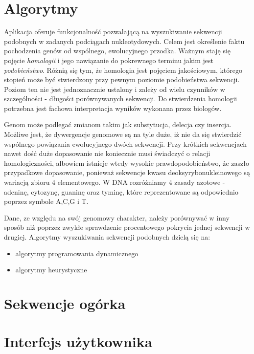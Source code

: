 \section{Algorytmy}
Aplikacja oferuje funkcjonalność pozwalającą na wyszukiwanie sekwencji podobnych w zadanych podciągach nukleotydowych.
Celem jest określenie faktu pochodzenia genów od wspólnego, ewolucyjnego przodka.
Ważnym staję się pojęcie \textit{homologii} i jego nawiązanie do pokrewnego terminu jakim jest \textit{podobieństwo}.
Różnią się tym, że homologia jest pojęciem jakościowym, którego stopień może być stwierdzony przy pewnym poziomie podobieństwa sekwencji.
Poziom ten nie jest jednoznacznie ustalony i zależy od wielu czynników w szczególności - długości porównywanych sekwencji.
Do stwierdzenia homologii potrzebna jest fachowa interpretacja wyników wykonana przez biologów.

Genom może podlegać zmianom takim jak substytucja, delecja czy insercja.
Możliwe jest, że dywergencje genomowe są na tyle duże, iż nie da się stwierdzić wspólnego powiązania ewolucyjnego dwóch sekwencji.
Przy krótkich sekwencjach nawet dość duże dopasowanie nie koniecznie musi świadczyć o relacji homologiczności, albowiem istnieje wtedy wysokie prawdopodobieństwo, że zaszło przypadkowe dopasowanie, ponieważ sekwencje kwasu deoksyrybonukleinowego są wariacją zbioru 4 elementowego. W DNA rozróżniamy 4 zasady azotowe - adeninę, cytozynę, guaninę oraz tyminę, które reprezentowane są odpowiednio poprzez symbole A,C,G i T.

Dane, ze względu na swój genomowy charakter, należy porównywać w inny sposób niż poprzez zwykłe sprawdzenie procentowego pokrycia jednej sekwencji w drugiej.
Algorytmy wyszukiwania sekwencji podobnych dzielą się na:
\begin{itemize}
	\item algorytmy programowania dynamicznego
	\item algorytmy heurystyczne
\end{itemize}



\section{Sekwencje ogórka}

\section{Interfejs użytkownika}

